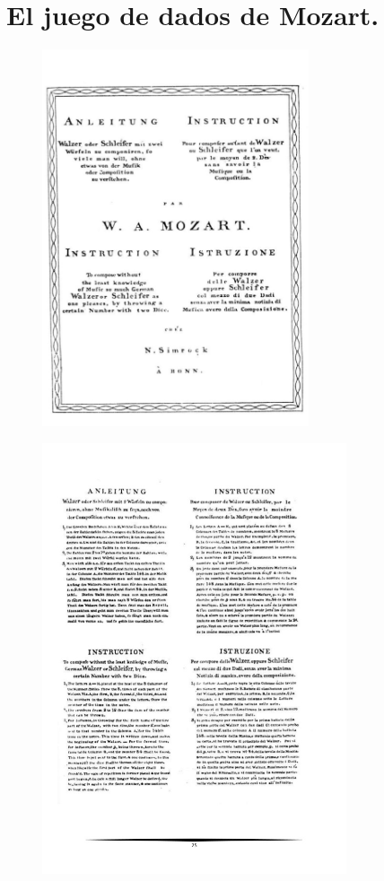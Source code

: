 \documentclass[a4paper, openright, 11pt, titlepage]{report}
\theoremstyle{definition}\newtheorem{defin}[propo]{Definition}
\theoremstyle{definition}\newtheorem{obser}[propo]{Remark}
\theoremstyle{definition}\newtheorem{ejem}[propo]{Ejemplo}
\theoremstyle{definition}\newtheorem{algoritmo}[propo]{Algoritmo}
\begin{document}
\chapter{El juego de dados de Mozart.}
\begin{figure}[H]
    \centering
    \includegraphics[width = 0.7\textwidth]{mozart1.png}
\end{figure}
\begin{figure}[H]
    \centering
    \includegraphics[width = 0.8\textwidth]{mozart2.png}
\end{figure}
\end{document}
